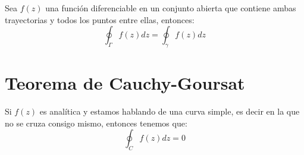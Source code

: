 \documentclass[12pt, fleqn]{report}                             %
\theoremstyle{break}                                            %
\begin{document}
            Sea $f(z)$ una función diferenciable en un conjunto abierta que contiene ambas
            trayectorias y todos los puntos entre ellas, entonces:
            \begin{equation*}
                \oint_\Gamma f(z) dz = \oint_\gamma f(z) dz
            \end{equation*}




        \clearpage
        \section{Teorema de Cauchy-Goursat}

            Si $f(z)$ es analítica y estamos hablando de una curva simple, es decir
            en la que no se cruza consigo mismo, entonces tenemos que:
            \begin{equation*}
                \oint_C f(z) dz = 0
            \end{equation*}
\end{document}
